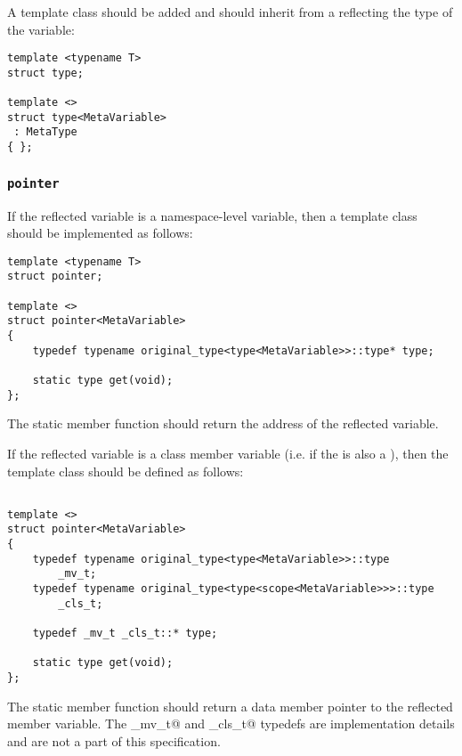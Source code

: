 A template class \verb@type@ should be added and should inherit
from a  reflecting the type of the variable:

\begin{verbatim}
template <typename T>
struct type;

template <>
struct type<MetaVariable>
 : MetaType
{ };
\end{verbatim}

\subsubsection{\texttt{pointer}}

If the reflected variable is a namespace-level variable, then a template
class \verb@pointer@ should be implemented as follows:

\begin{verbatim}
template <typename T>
struct pointer;

template <>
struct pointer<MetaVariable>
{
	typedef typename original_type<type<MetaVariable>>::type* type;

	static type get(void);
};
\end{verbatim}

The static member function \verb@get@ should return the address of the reflected variable.

If the reflected variable is a class member variable (i.e. if the 
is also a ), then the \verb@pointer@ template class should be
defined as follows:

\begin{verbatim}

template <>
struct pointer<MetaVariable>
{
	typedef typename original_type<type<MetaVariable>>::type
		_mv_t;
	typedef typename original_type<type<scope<MetaVariable>>>::type
		_cls_t;

	typedef _mv_t _cls_t::* type;

	static type get(void);
};

\end{verbatim}

The static member function \verb@get@ should return a data member pointer to
the reflected member variable. The \verb@_mv_t@ and \verb@_cls_t@ typedefs
are implementation details and are not a part of this specification.
